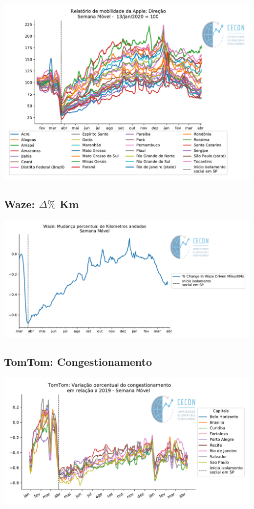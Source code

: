 \documentclass{SelfArx}
\begin{document}
\begin{center}
\includegraphics[width=.9\linewidth]{./figs/Granulares/AppleReport_Brasil.pdf}
\end{center}

\subsection*{Waze: \(\Delta \%\) Km}
\label{sec:org3c49aa6}

\begin{center}
\includegraphics[width=.9\linewidth]{./figs/Granulares/Waze_Brasil.pdf}
\end{center}

\subsection*{TomTom: Congestionamento}
\label{sec:org802702b}

\begin{center}
\includegraphics[width=.9\linewidth]{./figs/Granulares/TomTom_Brasil.pdf}
\end{center}
\end{document}
